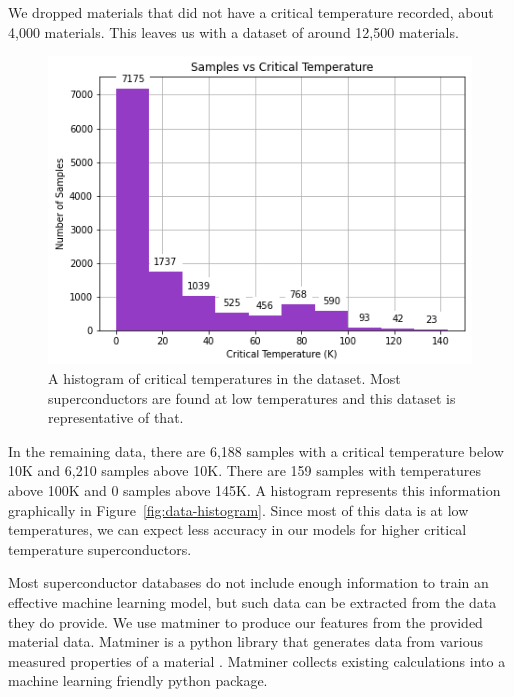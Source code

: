 \documentclass[twocolumn, nofootinbib, secnumarabic, amssymb, nobibnotes, aps, prd]{revtex4-2}
\begin{document}
We dropped materials that did not have a critical temperature recorded, about 4,000 materials. This leaves us with a dataset of around 12,500 materials. %

\begin{figure}[!h]
   \centering %
   \includegraphics[width=\columnwidth]{images/dataset_histogram.png}
   \caption{A histogram of critical temperatures in the dataset. Most superconductors are found at low temperatures and this dataset is representative of that.} %
\end{figure}\label{fig:data-histogram}

In the remaining data, there are 6,188 samples with a critical temperature below 10K and 6,210 samples above 10K. There are 159 samples with temperatures above 100K and 0 samples above 145K. A histogram represents this information graphically in Figure~\ref{fig:data-histogram}. Since most of this data is at low temperatures, we can expect less accuracy in our models for higher critical temperature superconductors.

Most superconductor databases do not include enough information to train an effective machine learning model, but such data can be extracted from the data they do provide. We use matminer to produce our features from the provided material data. Matminer is a python library that generates data from various measured properties of a material \cite{WARD201860}. Matminer collects existing calculations into a machine learning friendly python package. %
\end{document}
